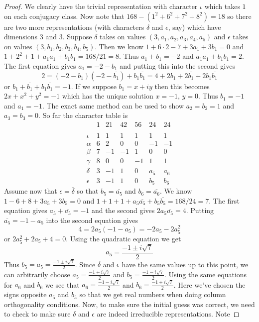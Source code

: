 \documentclass{article}
\begin{document}
\begin{proof}
We clearly have the trivial representation with character $\iota$ which takes $1$ on each conjugacy class. Now note that $168 - (1^2 + 6^2 + 7^2 + 8^2) = 18$ so there are two more representations (with characters $\delta$ and $\epsilon$, say) which have dimensions $3$ and $3$. Suppose $\delta$ takes on values $(3, a_1, a_2, a_3, a_4, a_5)$ and $\epsilon$ takes on values $(3, b_1, b_2, b_3, b_4, b_5)$. Then we know $1 + 6 \cdot 2 - 7 + 3 a_1 + 3 b_1 = 0$ and $1 + 2^2 + 1 + a_1\overline{a_1} + b_1\overline{b_1} = 168/21 = 8$. Thus $a_1 + b_1 = -2$ and $a_1\overline{a_1} + b_1 \overline{b_1} = 2$. The first equation gives $a_1 = -2 - b_1$ and putting this into the second gives
\[
2 = (-2 - b_1)(-2 - \overline{b_1}) + b_1 \overline{b_1} = 4 + 2b_1 + 2\overline{b_1} + 2b_1\overline{b_1}
\]
or $b_1 + \overline{b_1} + b_1\overline{b_1} = -1$. If we suppose $b_1 = x + iy$ then this becomes $2x + x^2 + y^2 = -1$ which has the unique solution $x = -1$, $y = 0$. Thus $b_1 = -1$ and $a_1 = -1$. The exact same method can be used to show $a_2 = b_2 = 1$ and $a_3 = b_3 = 0$. So far the character table is
\[
\begin{array}{rrrrrrr}
& 1 & 21 & 42 & 56 & 24 & 24\\
&&&&&&\\
\iota & 1 & 1 & 1 & 1 & 1 & 1\\
\alpha & 6 & 2 & 0 & 0 & -1 & -1\\
\beta & 7 & -1 & -1 & 1 & 0 & 0\\
\gamma & 8 & 0 & 0 & -1 & 1 & 1\\
\delta & 3 & -1 & 1 & 0 & a_5 & a_6\\
\epsilon & 3 & -1 & 1 & 0 & b_5 & b_6
\end{array}
\]
Assume now that $\epsilon = \overline{\delta}$ so that $b_5 = \overline{a_5}$ and $b_6 = \overline{a_6}$. We know $1 - 6 + 8 + 3 a_5 + 3 b_5 = 0$ and $1 + 1 + 1 + a_5\overline{a_5} + b_5\overline{b_5} = 168/24 = 7$. The first equation gives $a_5 + \overline{a_5} = -1$ and the second gives $2 a_5\overline{a_5} = 4$. Putting $\overline{a_5} = -1 - a_5$ into the second equation gives
\[
4 = 2 a_5 (-1 - a_5) = -2 a_5 - 2a_5^2
\]
or $2a_5^2 + 2a_5 + 4 = 0$. Using the quadratic equation we get
\[
a_5 = \frac{-1 \pm i \sqrt{7}}{2}
\]
Thus $b_5 = \overline{a_5} = \frac{-1 \pm i \sqrt{7}}{2}$. Since $\delta$ and $\epsilon$ have the same values up to this point, we can arbitrarily choose $a_5 = \frac{-1 + i \sqrt{7}}{2}$ and $b_5 = \frac{-1 - i\sqrt{7}}{2}$. Using the same equations for $a_6$ and $b_6$ we see that $a_6 = \frac{-1 - i \sqrt{7}}{2}$ and $b_6 = \frac{-1 + i \sqrt{7}}{2}$. Here we've chosen the signs opposite $a_5$ and $b_5$ so that we get real numbers when doing column orthogonality conditions. Now, to make sure the initial guess was correct, we need to check to make sure $\delta$ and $\epsilon$ are indeed irreducible representations. Note

\end{proof}
\end{document}
